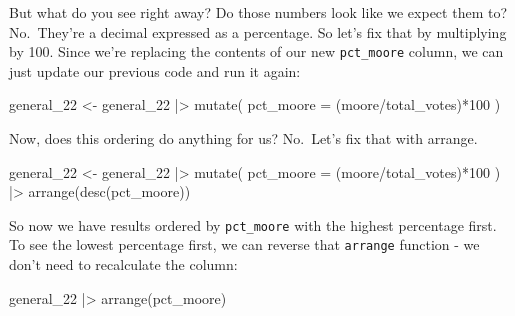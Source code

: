 \documentclass[
  letterpaper,
  DIV=11,
  numbers=noendperiod]{scrreprt}
\newenvironment{Shaded}{\begin{snugshade}}{\end{snugshade}}
\newcommand{\AttributeTok}[1]{\textcolor[rgb]{0.40,0.45,0.13}{#1}}
\newcommand{\DecValTok}[1]{\textcolor[rgb]{0.68,0.00,0.00}{#1}}
\newcommand{\FunctionTok}[1]{\textcolor[rgb]{0.28,0.35,0.67}{#1}}
\newcommand{\NormalTok}[1]{\textcolor[rgb]{0.00,0.23,0.31}{#1}}
\newcommand{\OtherTok}[1]{\textcolor[rgb]{0.00,0.23,0.31}{#1}}
\newcommand{\SpecialCharTok}[1]{\textcolor[rgb]{0.37,0.37,0.37}{#1}}
\begin{document}
But what do you see right away? Do those numbers look like we expect
them to? No.~They're a decimal expressed as a percentage. So let's fix
that by multiplying by 100. Since we're replacing the contents of our
new \texttt{pct\_moore} column, we can just update our previous code and
run it again:

\begin{Shaded}
\begin{Highlighting}[]
\NormalTok{general\_22 }\OtherTok{\textless{}{-}}\NormalTok{ general\_22 }\SpecialCharTok{|\textgreater{}}
  \FunctionTok{mutate}\NormalTok{(}
    \AttributeTok{pct\_moore =}\NormalTok{ (moore}\SpecialCharTok{/}\NormalTok{total\_votes)}\SpecialCharTok{*}\DecValTok{100}
\NormalTok{  )}
\end{Highlighting}
\end{Shaded}

Now, does this ordering do anything for us? No.~Let's fix that with
arrange.

\begin{Shaded}
\begin{Highlighting}[]
\NormalTok{general\_22 }\OtherTok{\textless{}{-}}\NormalTok{ general\_22 }\SpecialCharTok{|\textgreater{}}
  \FunctionTok{mutate}\NormalTok{(}
    \AttributeTok{pct\_moore =}\NormalTok{ (moore}\SpecialCharTok{/}\NormalTok{total\_votes)}\SpecialCharTok{*}\DecValTok{100}
\NormalTok{  ) }\SpecialCharTok{|\textgreater{}} 
  \FunctionTok{arrange}\NormalTok{(}\FunctionTok{desc}\NormalTok{(pct\_moore))}
\end{Highlighting}
\end{Shaded}

So now we have results ordered by \texttt{pct\_moore} with the highest
percentage first. To see the lowest percentage first, we can reverse
that \texttt{arrange} function - we don't need to recalculate the
column:

\begin{Shaded}
\begin{Highlighting}[]
\NormalTok{general\_22 }\SpecialCharTok{|\textgreater{}}
  \FunctionTok{arrange}\NormalTok{(pct\_moore)}
\end{Highlighting}
\end{Shaded}
\end{document}
